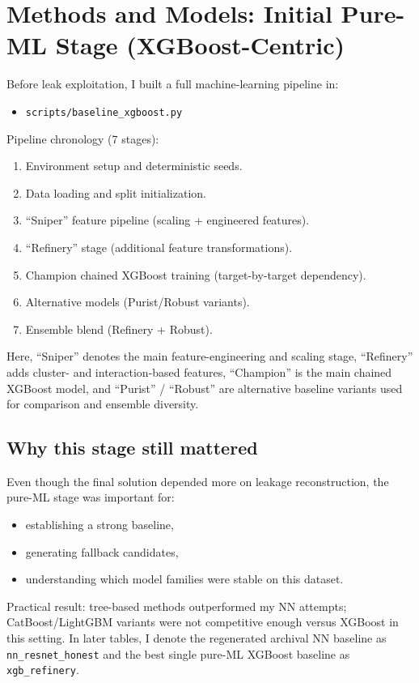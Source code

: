 \section{Methods and Models: Initial Pure-ML Stage (XGBoost-Centric)}

Before leak exploitation, I built a full machine-learning pipeline in:
\begin{itemize}[leftmargin=1.5em]
  \item \texttt{scripts/baseline\_xgboost.py}
\end{itemize}

Pipeline chronology (7 stages):
\begin{enumerate}[leftmargin=1.5em]
  \item Environment setup and deterministic seeds.
  \item Data loading and split initialization.
  \item ``Sniper'' feature pipeline (scaling + engineered features).
  \item ``Refinery'' stage (additional feature transformations).
  \item Champion chained XGBoost training (target-by-target dependency).
  \item Alternative models (Purist/Robust variants).
  \item Ensemble blend (Refinery + Robust).
\end{enumerate}
Here, ``Sniper'' denotes the main feature-engineering and scaling stage, ``Refinery'' adds cluster- and interaction-based features, ``Champion'' is the main chained XGBoost model, and ``Purist'' / ``Robust'' are alternative baseline variants used for comparison and ensemble diversity.

\subsection{Why this stage still mattered}
Even though the final solution depended more on leakage reconstruction, the pure-ML stage was important for:
\begin{itemize}[leftmargin=1.5em]
  \item establishing a strong baseline,
  \item generating fallback candidates,
  \item understanding which model families were stable on this dataset.
\end{itemize}

Practical result: tree-based methods outperformed my NN attempts; CatBoost/LightGBM variants were not competitive enough versus XGBoost in this setting.
In later tables, I denote the regenerated archival NN baseline as \texttt{nn\_resnet\_honest} and the best single pure-ML XGBoost baseline as \texttt{xgb\_refinery}.

